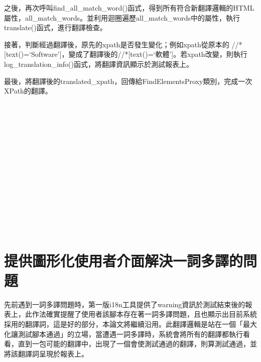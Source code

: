 之後，再次呼叫find\_all\_match\_word()函式，得到所有符合新翻譯邏輯的HTML屬性，all\_match\_words。並利用迴圈遍歷all\_match\_words中的屬性，執行translate()函式，進行翻譯檢查。
	
接著，判斷經過翻譯後，原先的xpath是否發生變化；例如xpath從原本的 //*[text()=‘Software']，變成了翻譯後的//*[text()=‘軟體']。若xpath改變，則執行log\_translation\_info()函式，將翻譯資訊顯示於測試報表上。

最後，將翻譯後的translated\_xpath，回傳給FindElementsProxy類別，完成一次XPath的翻譯。

\hspace*{\fill} \\
\\ \hspace*{\fill} \\
\\ \hspace*{\fill} \\
\\ \hspace*{\fill} \\
\\ \hspace*{\fill} \\
\\ \hspace*{\fill} \\
\\ \hspace*{\fill} \\
\section{提供圖形化使用者介面解決一詞多譯的問題}
先前遇到一詞多譯問題時，第一版i18n工具提供了warning資訊於測試結束後的報表上，此作法確實提醒了使用者該腳本存在著一詞多譯問題，且也顯示出目前系統採用的翻譯詞，這是好的部分，本論文將繼續沿用。此翻譯邏輯是站在一個「最大化讓測試腳本通過」的立場，當遭遇一詞多譯時，系統會將所有的翻譯都執行看看，直到一包可能的翻譯中，出現了一個會使測試通過的翻譯，則算測試通過，並將該翻譯詞呈現於報表上。

